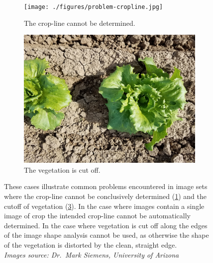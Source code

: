 \documentclass[letterpaper]{article}
\begin{document}
\begin{figure}[H]
	\begin{subfigure}[h]{0.48\linewidth}
		\texttt{[image: ./figures/problem-cropline.jpg]}
		\caption{The crop-line cannot be determined.}
		\label{fig:problem-cropline}
		
	\end{subfigure}
	\hfill
	\begin{subfigure}[h]{0.48\linewidth}
		\includegraphics[width=1\linewidth]{./figures/problem-cutoff.jpg}
		\caption{The vegetation is cut off.}
		\label{fig:problem-cutoff}		
	\end{subfigure}%
	\caption[Common problems in field images]{These cases illustrate common problems encountered in image sets where the crop-line cannot be conclusively determined (\ref{fig:problem-cropline}) and the cutoff of vegetation (\ref{fig:problem-cutoff}). In the case where images contain a single image of crop the intended crop-line cannot be automatically determined. In the case where vegetation is cut off along the edges of the image shape analysis cannot be used, as otherwise the shape of the vegetation is distorted by the clean, straight edge. \\ \textit{Images source: Dr.~Mark Siemens, University of Arizona}}
\end{figure}
\end{document}
